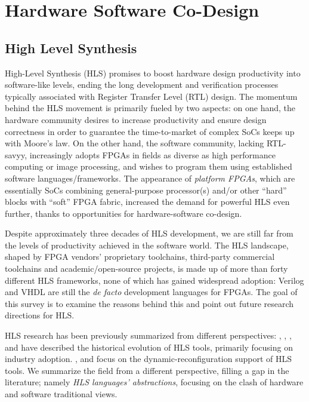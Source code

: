 \section{Hardware Software Co-Design}\label{sec:codesign}


\subsection{High Level Synthesis}

High-Level Synthesis (HLS) promises to boost hardware design productivity into software-like levels, ending the long development and verification processes typically associated with Register Transfer Level (RTL) design. The momentum behind the HLS movement is primarily fueled by two aspects: on one hand, the hardware community desires to increase productivity and ensure design correctness in order to guarantee the time-to-market of complex SoCs keeps up with Moore's law. On the other hand, the software community, lacking RTL-savyy, increasingly adopts FPGAs in fields as diverse as high performance computing or image processing, and wishes to program them using established software languages/frameworks. The appearance of \textit{platform FPGAs}, which are essentially SoCs combining general-purpose processor(s) and/or other ``hard'' blocks with ``soft'' FPGA fabric, increased the demand for powerful HLS even further, thanks to opportunities for hardware-software co-design.
\par Despite approximately three decades of HLS development, we are still far from the levels of productivity achieved in the software world. The HLS landscape, shaped by FPGA vendors' proprietary toolchains, third-party commercial toolchains and academic/open-source projects, is made up of more than forty different HLS frameworks, none of which has gained widespread adoption: Verilog and VHDL are still the \textit{de facto} development languages for FPGAs. The goal of this survey is to examine the reasons behind this and point out future research directions for HLS.

\par HLS research has been previously summarized from different perspectives: \cite{martin2009high}, \cite{7368920}, \cite{trimberger2015three}, \cite{meeus2012overview} and \cite{5737854} have described the historical evolution of HLS tools, primarily focusing on industry adoption. \cite{Zhang2000199}, \cite{compton2002reconfigurable} and \cite{cardoso2010compiling} focus on the dynamic-reconfiguration support of HLS tools. We summarize the field from a different perspective, filling a gap in the literature; namely \textit{HLS languages' abstractions}, focusing on the clash of hardware and software traditional views. 

